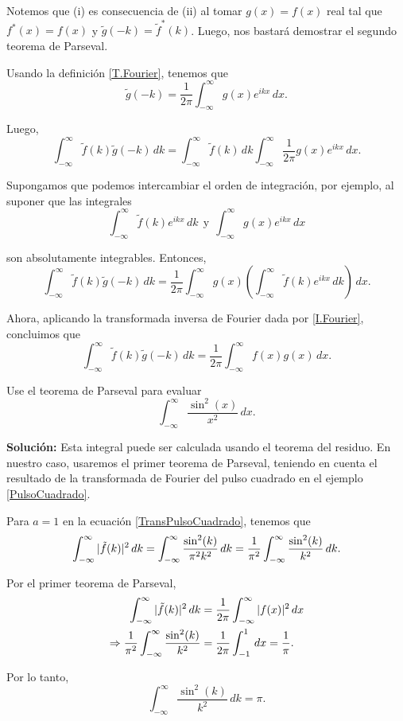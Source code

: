 \begin{demo}
Notemos que (i) es consecuencia de (ii) al tomar $g(x) = f(x)$ real tal que $f^*(x) = f(x)$ y $\tilde{g}(-k) = \tilde{f}^*(k)$. Luego, nos bastará demostrar el segundo teorema de Parseval.

Usando la definición \eqref{T.Fourier}, tenemos que 
$$\tilde{g}(-k) = \frac{1}{2\pi} \int_{-\infty}^{\infty} g(x) e^{ikx} \,dx.$$

Luego, 
$$\int_{-\infty}^{\infty} \tilde{f}(k) \tilde{g}(-k) \,dk = \int_{-\infty}^{\infty} \tilde{f}(k) \,dk \int_{-\infty}^{\infty} \frac{1}{2\pi} g(x) e^{ikx} \,dx.$$

Supongamos que podemos intercambiar el orden de integración, por ejemplo, al suponer que las integrales 
$$\int_{-\infty}^{\infty} \tilde{f}(k) e^{ikx} \,dk ~~\mbox{y}~~ \int_{-\infty}^{\infty} g(x) e^{ikx} \,dx$$

son absolutamente integrables. Entonces,
$$\int_{-\infty}^{\infty} \tilde{f}(k) \tilde{g}(-k) \,dk = \frac{1}{2\pi} \int_{-\infty}^{\infty} g(x) \left(  \int_{-\infty}^{\infty}  \tilde{f}(k) e^{ikx} \,dk\right) \,dx.$$

Ahora, aplicando la transformada inversa de Fourier dada por \eqref{I.Fourier}, concluimos que
$$\int_{-\infty}^{\infty} \tilde{f}(k) \tilde{g}(-k) \,dk = \frac{1}{2\pi} \int_{-\infty}^{\infty} f(x) g(x)  \,dx.$$

\end{demo}

\begin{ejemplo}
    Use el teorema de Parseval para evaluar
    $$\int_{-\infty}^{\infty}  \frac{\sin^2(x)}{x^2} \,dx.$$

    \textbf{Solución:} Esta integral puede ser calculada usando el teorema del residuo. En nuestro caso, usaremos el primer teorema de Parseval, teniendo en cuenta el resultado de la transformada de Fourier del pulso cuadrado en el ejemplo \ref{PulsoCuadrado}. 

    Para $a = 1$ en la ecuación \eqref{TransPulsoCuadrado}, tenemos que
    $$\int_{- \infty}^{\infty} |\Tilde{f}(k)|^2 \,dk = \int_{- \infty}^{\infty} \frac{\sin^2(k)}{\pi^2 k^2}  \,dk = \frac{1}{\pi^2} \int_{-\infty}^{\infty}  \frac{\sin^2(k)}{k^2} \,dk.$$

    Por el primer teorema de Parseval,
    \begin{align*}
        \int_{- \infty}^{\infty} |\Tilde{f}(k)|^2 \,dk &= \frac{1}{2\pi} \int_{-\infty}^{\infty} |f(x)|^2 \,dx \\
        \Rightarrow \frac{1}{\pi^2} \int_{-\infty}^{\infty}  \frac{\sin^2(k)}{k^2} &= \frac{1}{2\pi} \int_{-1}^1 \,dx = \frac{1}{\pi}. 
    \end{align*}

Por lo tanto,
$$\int_{-\infty}^{\infty}  \frac{\sin^2(k)}{k^2} \,dk = \pi.$$
\end{ejemplo}

